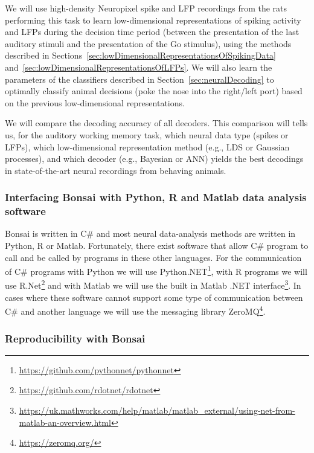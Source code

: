 \documentclass[a4paper,11point]{article}
\begin{document}
We will use high-density Neuropixel spike and LFP recordings from the rats
performing this task to learn low-dimensional representations of spiking
activity and LFPs during the decision time period (between the presentation of
the last auditory stimuli and the presentation of the Go stimulus), using the
methods described in
Sections~\ref{sec:lowDimensionalRepresentationsOfSpikingData}
and~\ref{sec:lowDimensionalRepresentationsOfLFPs}. We will also learn the
parameters of the classifiers described in Section~\ref{sec:neuralDecoding} to
optimally classify animal decisions (poke the nose into the right/left port)
based on the previous low-dimensional representations.

We will compare the decoding accuracy of all decoders. This comparison will
tells us, for the auditory working memory task, which neural data type (spikes
or LFPs), which low-dimensional representation method (e.g., LDS or Gaussian
processes), and which decoder (e.g., Bayesian or ANN) yields the best decodings
in state-of-the-art neural recordings from behaving animals.

\subsubsection{Interfacing Bonsai with Python, R and Matlab data analysis software}
\label{sec:bonsaiPythonMatlabCommunication}

Bonsai is written in C\# and most neural data-analysis methods are written in
Python, R or Matlab. Fortunately, there exist software that allow C\# program
to call and be called by programs in these other languages. For the
communication of C\# programs with Python we will use
Python.NET\footnote{\href{https://github.com/pythonnet/pythonnet}{https://github.com/pythonnet/pythonnet}},
with R programs we will use
R.Net\footnote{\href{https://github.com/rdotnet/rdotnet}{https://github.com/rdotnet/rdotnet}}
and with Matlab we will use the built in Matlab .NET
interface\footnote{\href{https://uk.mathworks.com/help/matlab/matlab\_external/using-net-from-matlab-an-overview.html}{https://uk.mathworks.com/help/matlab/matlab\_external/using-net-from-matlab-an-overview.html}}.
In cases where these software cannot support some type of communication between
C\# and another language we will use the messaging library
ZeroMQ\footnote{\href{https://zeromq.org/}{https://zeromq.org/}}.

\subsubsection{Reproducibility with Bonsai}
\label{sec:reproducibility}
\end{document}
